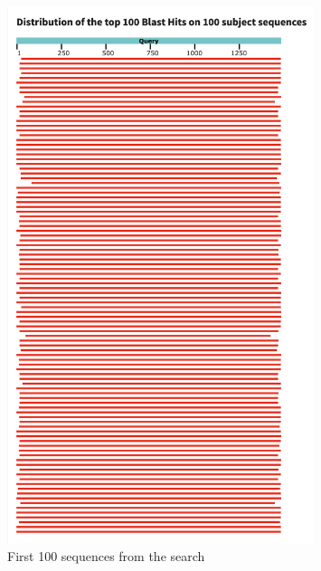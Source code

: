 \documentclass{article}
\begin{document}
\begin{figure}[H]
    \centering
    \includegraphics[width=0.8\textwidth]{figs/100_blast_seqs.png}
    \caption{First 100 sequences from the search}
\end{figure}
\end{document}
